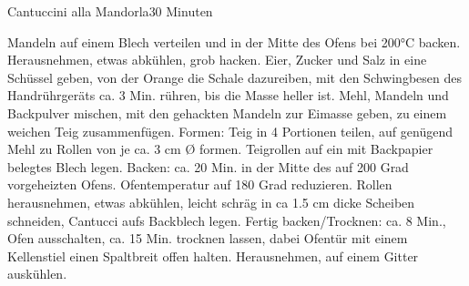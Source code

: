 \begin{recipe}{Cantuccini alla Mandorla}{}{30 Minuten}

Mandeln auf einem Blech verteilen und in der Mitte des Ofens bei 200°C backen. Herausnehmen, etwas abkühlen, grob hacken.
Eier, Zucker und Salz in eine Schüssel geben, von der Orange die Schale dazureiben, 
mit den Schwingbesen des Handrührgeräts ca. 3 Min. rühren, bis die Masse heller ist.
Mehl, Mandeln und Backpulver mischen, mit den gehackten Mandeln zur Eimasse geben, zu einem weichen Teig zusammenfügen.
\ingredient[]{}{}
Formen: Teig in 4 Portionen teilen, auf genügend Mehl zu Rollen von je ca. 3 cm Ø formen. Teigrollen auf ein mit Backpapier belegtes Blech legen.
\ingredient[]{}{}
Backen: ca. 20 Min. in der Mitte des auf 200 Grad vorgeheizten Ofens. Ofentemperatur auf 180 Grad reduzieren. 
Rollen herausnehmen, etwas abkühlen, leicht schräg in ca 1.5 cm dicke Scheiben schneiden, Cantucci aufs Backblech legen.
\ingredient[]{}{}
Fertig backen/Trocknen: ca. 8 Min., Ofen ausschalten, ca. 15 Min. trocknen lassen, dabei Ofentür mit einem Kellenstiel einen Spaltbreit offen halten. 
Herausnehmen, auf einem Gitter auskühlen.

\end{recipe}
